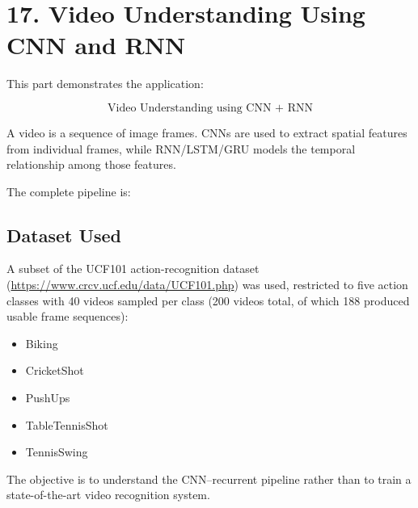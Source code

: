 \documentclass[10pt]{article}
\begin{document}
\section*{17. Video Understanding Using CNN and RNN}

This part demonstrates the application:

\[
\boxed{\text{Video Understanding using CNN + RNN}}
\]

A video is a sequence of image frames. CNNs are used to extract spatial
features from individual frames, while RNN/LSTM/GRU models the temporal
relationship among those features.

The complete pipeline is:

\begin{center}
\end{center}

\subsection*{Dataset Used}

A subset of the UCF101 action-recognition dataset
(\url{https://www.crcv.ucf.edu/data/UCF101.php}) was used, restricted to
five action classes with 40 videos sampled per class (200 videos total, of
which 188 produced usable frame sequences):

\begin{itemize}
\item Biking
\item CricketShot
\item PushUps
\item TableTennisShot
\item TennisSwing
\end{itemize}

The objective is to understand the CNN--recurrent pipeline rather than to
train a state-of-the-art video recognition system.
\end{document}
